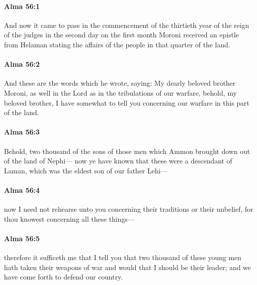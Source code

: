 		\paragraph{Alma 56:1} %
			\label{ALMA-56-1}

			And now it came to pass
			in the commencement of the thirtieth year of the reign of the judges
			in the second day on the first month
			Moroni received an epistle from Helaman
			stating the affairs of the people in that quarter of the land.

		\paragraph{Alma 56:2} %
			\label{ALMA-56-2}

			And these are the words which he wrote, saying:
			My dearly beloved brother Moroni,
			as well in the Lord as in the tribulations of our warfare,
			behold, my beloved brother, I have somewhat to tell you
			concerning our warfare in this part of the land.

		\paragraph{Alma 56:3} %
			\label{ALMA-56-3}

			Behold, two thousand of the sons of those men
			which Ammon brought down out of the land of Nephi---
			now ye have known that these were a descendant of Laman,
			which was the eldest son of our father Lehi---

		\paragraph{Alma 56:4} %
			\label{ALMA-56-4}

			now I need not rehearse unto you concerning their traditions or their unbelief,
			for thou knowest concerning all these things---

		\paragraph{Alma 56:5} %
			\label{ALMA-56-5}

			therefore it sufficeth me that I tell you
			that two thousand of these young men hath taken their weapons of war
			and would that I should be their leader;
			and we have come forth to defend our country.

